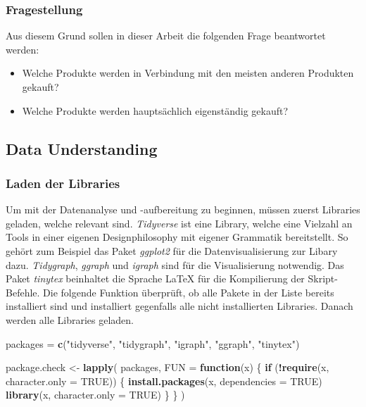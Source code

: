 \documentclass[
  12 pt,
]{article}
\newenvironment{Shaded}{\begin{snugshade}}{\end{snugshade}}
\newcommand{\ControlFlowTok}[1]{\textcolor[rgb]{0.13,0.29,0.53}{\textbf{#1}}}
\newcommand{\DataTypeTok}[1]{\textcolor[rgb]{0.13,0.29,0.53}{#1}}
\newcommand{\KeywordTok}[1]{\textcolor[rgb]{0.13,0.29,0.53}{\textbf{#1}}}
\newcommand{\NormalTok}[1]{#1}
\newcommand{\OperatorTok}[1]{\textcolor[rgb]{0.81,0.36,0.00}{\textbf{#1}}}
\newcommand{\OtherTok}[1]{\textcolor[rgb]{0.56,0.35,0.01}{#1}}
\newcommand{\StringTok}[1]{\textcolor[rgb]{0.31,0.60,0.02}{#1}}
\providecommand{\tightlist}{%
  \setlength{\itemsep}{0pt}\setlength{\parskip}{0pt}}
\begin{document}
\hypertarget{fragestellung}{%
\subsubsection{Fragestellung}\label{fragestellung}}

Aus diesem Grund sollen in dieser Arbeit die folgenden Frage beantwortet
werden:\\

\begin{itemize}
\tightlist
\item
  Welche Produkte werden in Verbindung mit den meisten anderen Produkten
  gekauft?
\item
  Welche Produkte werden hauptsächlich eigenständig gekauft?
\end{itemize}

\hypertarget{data-understanding}{%
\subsection{Data Understanding}\label{data-understanding}}

\hypertarget{laden-der-libraries}{%
\subsubsection{Laden der Libraries}\label{laden-der-libraries}}

Um mit der Datenanalyse und -aufbereitung zu beginnen, müssen zuerst
Libraries geladen, welche relevant sind. \emph{Tidyverse} ist eine
Library, welche eine Vielzahl an Tools in einer eigenen Designphilosophy
mit eigener Grammatik bereitstellt. So gehört zum Beispiel das Paket
\emph{ggplot2} für die Datenvisualisierung zur Libary dazu.
\emph{Tidygraph}, \emph{ggraph} und \emph{igraph} sind für die
Visualisierung notwendig. Das Paket \emph{tinytex} beinhaltet die
Sprache LaTeX für die Kompilierung der Skript-Befehle. Die folgende
Funktion überprüft, ob alle Pakete in der Liste bereits installiert sind
und installiert gegenfalls alle nicht installierten Libraries. Danach
werden alle Libraries geladen.

\begin{Shaded}
\begin{Highlighting}[]
\NormalTok{packages =}\StringTok{ }\KeywordTok{c}\NormalTok{(}\StringTok{"tidyverse"}\NormalTok{, }\StringTok{"tidygraph"}\NormalTok{,}
             \StringTok{"igraph"}\NormalTok{, }\StringTok{"ggraph"}\NormalTok{, }\StringTok{"tinytex"}\NormalTok{)}

\NormalTok{package.check <-}\StringTok{ }\KeywordTok{lapply}\NormalTok{(}
\NormalTok{  packages,}
  \DataTypeTok{FUN =} \ControlFlowTok{function}\NormalTok{(x) \{}
    \ControlFlowTok{if}\NormalTok{ (}\OperatorTok{!}\KeywordTok{require}\NormalTok{(x, }\DataTypeTok{character.only =} \OtherTok{TRUE}\NormalTok{)) \{}
      \KeywordTok{install.packages}\NormalTok{(x, }\DataTypeTok{dependencies =} \OtherTok{TRUE}\NormalTok{)}
      \KeywordTok{library}\NormalTok{(x, }\DataTypeTok{character.only =} \OtherTok{TRUE}\NormalTok{)}
\NormalTok{    \}}
\NormalTok{  \}}
\NormalTok{)}
\end{Highlighting}
\end{Shaded}
\end{document}

